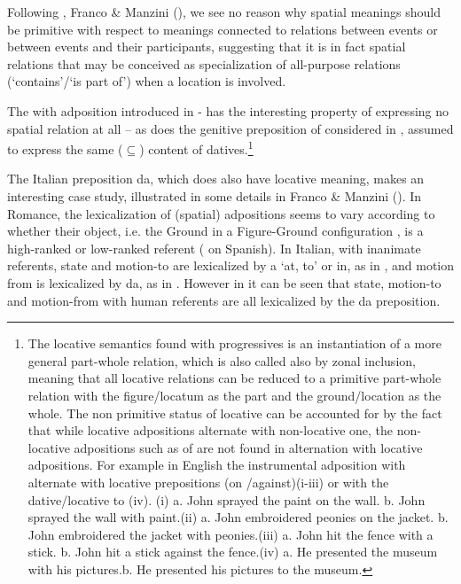 \documentclass[output=paper,modfonts,nonflat,newtxmath,colorlinks,citecolor=brown]{langsci/langscibook}
\begin{document}
Following \citet{ManziniSavoia2011}, Franco \& Manzini (\citeyear{FrancoManzini2017Gen, FrancoManzini2017Ins}), we see no reason why spatial meanings should be primitive with respect to meanings connected to relations between events or between events and their participants, suggesting that it is in fact spatial relations that may be conceived as specialization of all-purpose relations (‘contains’/‘is part of’) when a location is involved. 

The {with} adposition introduced in - has the interesting property of expressing no spatial relation at all \citep{Levinson2011} – as does the genitive preposition {of} considered in , assumed to express the same (${\subseteq}$) content of datives.\footnote{The locative semantics found with progressives is an instantiation of a more general part-whole relation, which is also called also by \citet[170]{BelvindenDikken1997} {zonal inclusion}, meaning that all locative relations can be reduced to a primitive part-whole relation with the {figure/locatum} as the {part} and the {ground/location} as the {whole}. The non primitive status of locative can be accounted for by the fact that while locative adpositions alternate with non-locative one, the non-locative adpositions such as {of} are not found in alternation with locative adpositions. For example in English the instrumental adposition {with} alternate with locative prepositions ({on /against})(i-iii) or with the dative/locative {to} (iv). (i) a.   John sprayed the paint on the wall. b.   John sprayed the wall with paint.(ii)   a.   John embroidered peonies on the jacket. b.   John embroidered the jacket with peonies.(iii)  a.   John hit the fence with a stick. b.   John hit a stick against the fence.(iv)   a.   He presented the museum with his pictures.b.    He presented his pictures to the museum.} 

The Italian preposition {da}, which does also have locative meaning, makes an interesting case study, illustrated in some details in Franco \& Manzini (\citeyear{FrancoManzini2017Gen, FrancoManzini2017Ins}). In Romance, the lexicalization of (spatial) adpositions seems to vary according to whether their object, i.e. the Ground in a Figure-Ground configuration \citep{Svenonius2006axial}, is a high-ranked or low-ranked referent (\citealt{Fabregas2015direccionales} on Spanish). In Italian, with inanimate referents, state and motion-to are lexicalized by {a} ‘at, to’ or {in}, as in , and motion from is lexicalized by {da}, as in . However in  it can be seen that state, motion-to and motion-from with human referents are all lexicalized by the {da} preposition. 
\end{document}

